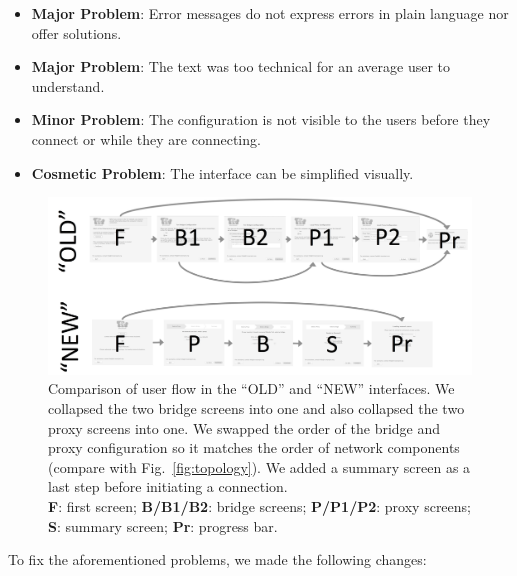 \documentclass[USenglish,oneside,twocolumn]{article}
\begin{document}
\begin{itemize}
\item {\bfseries Major Problem}: Error messages do not express errors in plain language nor offer solutions. 
\item {\bfseries Major Problem}: The text was too technical for an average user to understand. 
\item {\bfseries Minor Problem}: The configuration is not visible to the users before they connect or while they are connecting.
\item {\bfseries Cosmetic Problem}: The interface can be simplified visually. 
 \end{itemize} 
 
 \label{redesign}
\begin{figure}[t]
\centering
\includegraphics[width=.85\textwidth]{old-and-new-flows.png}
\caption{
Comparison of user flow in the ``OLD'' and ``NEW'' interfaces.
We collapsed the two bridge screens into one 
and also collapsed the two proxy screens into one.
We swapped the order of the bridge and proxy configuration
so it matches the order of network components (compare with Fig.~\ref{fig:topology}).
We added a summary screen as a last step before initiating a connection.\\
\textbf{F}: first screen;
\textbf{B/B1/B2}: bridge screens;
\textbf{P/P1/P2}: proxy screens;
\textbf{S}: summary screen;
\textbf{Pr}: progress bar.
}
\label{fig:flow}
\end{figure} 

To fix the aforementioned problems, we made the following changes: \\
\end{document}
